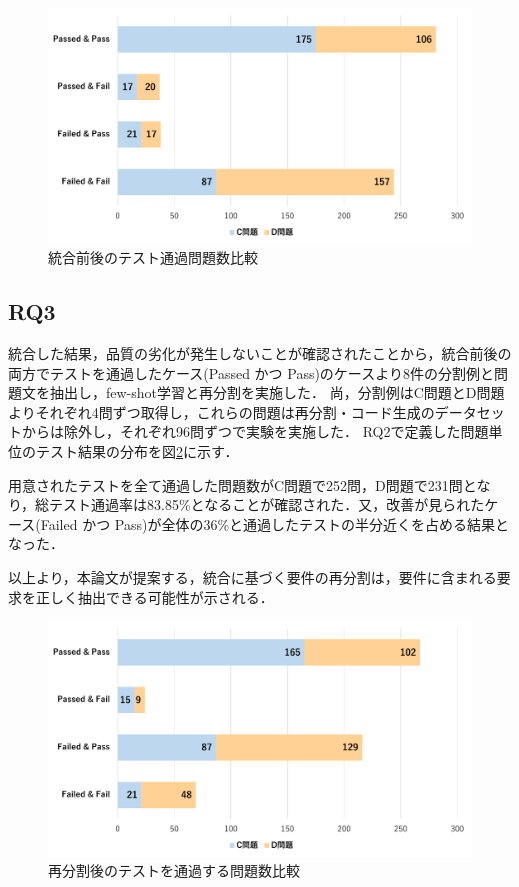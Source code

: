 \documentclass[submit,techrep,noauthor]{ipsj}
\begin{document}
\begin{figure}[t]
    \centering
    \includegraphics[width=1.0\linewidth]{./Toyoshima_fig/SIGSE_PF.pdf}
    \caption{統合前後のテスト通過問題数比較}
    \label{rq2_1}
\end{figure}

\subsection{RQ3}
統合した結果，品質の劣化が発生しないことが確認されたことから，統合前後の両方でテストを通過したケース(Passed かつ Pass)のケースより8件の分割例と問題文を抽出し，few-shot学習と再分割を実施した．
尚，分割例はC問題とD問題よりそれぞれ4問ずつ取得し，これらの問題は再分割・コード生成のデータセットからは除外し，それぞれ96問ずつで実験を実施した．
RQ2で定義した問題単位のテスト結果の分布を図\ref{rq3_1}に示す．

用意されたテストを全て通過した問題数がC問題で252問，D問題で231問となり，総テスト通過率は83.85\%となることが確認された．又，改善が見られたケース(Failed かつ Pass)が全体の36\%と通過したテストの半分近くを占める結果となった．

以上より，本論文が提案する，統合に基づく要件の再分割は，要件に含まれる要求を正しく抽出できる可能性が示される．

\begin{figure}[t]
    \centering
    \includegraphics[width=1.0\linewidth]{./Toyoshima_fig/RQ3_1.pdf}
    \caption{再分割後のテストを通過する問題数比較}
    \label{rq3_1}
\end{figure}
\end{document}
